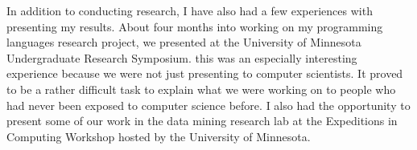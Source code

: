 \documentclass[a4paper,12pt]{article}
\newcommand{\tab}{\hspace*{2em}}
\begin{document}

In addition to conducting research, I have also had a few experiences with presenting my results.  About four months into working on my programming languages research project, we presented at the University of Minnesota Undergraduate Research Symposium.  this was an especially interesting experience because we were not just presenting to computer scientists.  It proved to be a rather difficult task to explain what we were working on to people who had never been exposed to computer science before. I also had the opportunity to present some of our work in the data mining research lab at the Expeditions in Computing Workshop hosted by the University of Minnesota. 
\end{document}
